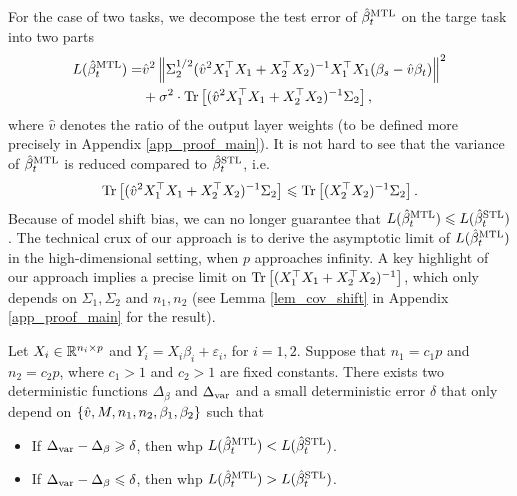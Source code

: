 For the case of two tasks, we decompose the test error of $\hat{\beta}_{t}^{\text{MTL}}$ on the targe task into two parts
\begin{align}
	L(\hat{\beta}_t^{\text{MTL}}) =& \hat{v}^2 \left\| \Sigma_2^{1/2} (\hat{v}^2 X_1^{\top}X_1 + X_2^{\top}X_2)^{-1}X_1^{\top}X_1 (\beta_s - \hat{v}\beta_t) \right\|^2 \nonumber \\
	&+ \sigma^2\cdot \operatorname{Tr}\left[(\hat{v}^2 X_1^{\top}X_1 + X_2^{\top}X_2)^{-1}\Sigma_2\right], \label{eq_te_model_shift}
\end{align}
where $\hat{v}$ denotes the ratio of the output layer weights (to be defined more precisely in Appendix \ref{app_proof_main}).
It is not hard to see that the variance of $\hat{\beta}_t^{\text{MTL}}$ is reduced compared to $\hat{\beta}_t^{\text{STL}}$, i.e. %
\[ \operatorname{Tr}\left[(\hat{v}^2 X_1^{\top}X_1 + X_2^{\top}X_2)^{-1}\Sigma_2\right] \leqslant \operatorname{Tr}\left[(X_2^{\top}X_2)^{-1}\Sigma_2\right]. \]
Because of model shift bias, we can no longer guarantee that $L(\hat{\beta}_{t}^{\text{MTL}}) \leqslant L(\hat{\beta}_t^{\text{STL}})$.
The technical crux of our approach is to derive the asymptotic limit of $L(\hat{\beta}_t^{\text{MTL}})$ in the high-dimensional setting, when $p$ approaches infinity.
A key highlight of our approach implies a precise limit on $\operatorname{Tr}\left[(X_1^{\top}X_1 + X_2^{\top}X_2)^{-1}\right]$, which only depends on $\Sigma_1, \Sigma_2$ and $n_1, n_2$ (see Lemma \ref{lem_cov_shift} in Appendix \ref{app_proof_main} for the result).

\begin{theorem}\label{thm_main_informal}
	Let $X_i \in\mathbb{R}^{n_i \times p}$ and $Y_i = X_i\beta_i + \varepsilon_i$, for $i = 1, 2$.
	Suppose that $n_1 = c_1 p$ and $n_2 = c_2 p$, where $c_1>1$ and $c_2 >1$ are fixed constants.
	There exists two deterministic functions $\Delta_{\beta}$ and $\Delta_{\text{var}}$ and a small deterministic error $\delta$ that only depend on $\{\hat{v}, M, n_1, n_2, \beta_1, \beta_2\}$ such that
	\begin{itemize}
		\item If $\Delta_{\text{var}} - \Delta_{\beta} \geqslant \delta$, then whp $L(\hat{\beta}_t^{\text{MTL}}) < L(\hat{\beta}_t^{\text{STL}})$.
		\item If $\Delta_{\text{var}} - \Delta_{\beta} \leqslant \delta$, then whp $L(\hat{\beta}_t^{\text{MTL}}) > L(\hat{\beta}_t^{\text{STL}})$.
	\end{itemize}
\end{theorem}


